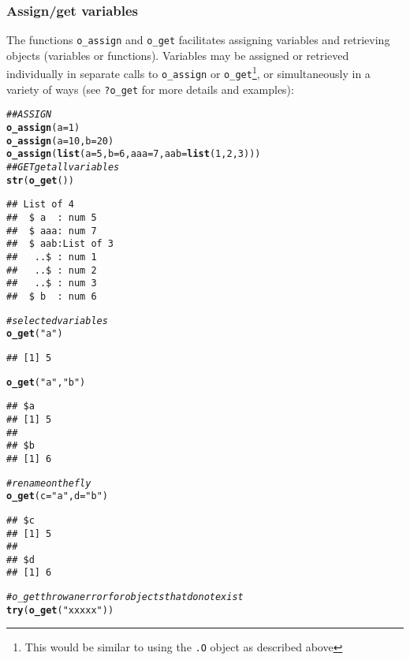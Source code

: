 \documentclass[english,10pt,a4paper]{article}\usepackage[]{graphicx}\usepackage[]{color}
\makeatletter
\newcommand{\hlnum}[1]{\textcolor[rgb]{0.686,0.059,0.569}{#1}}%
\newcommand{\hlstr}[1]{\textcolor[rgb]{0.192,0.494,0.8}{#1}}%
\newcommand{\hlcom}[1]{\textcolor[rgb]{0.678,0.584,0.686}{\textit{#1}}}%
\newcommand{\hlstd}[1]{\textcolor[rgb]{0.345,0.345,0.345}{#1}}%
\newcommand{\hlkwc}[1]{\textcolor[rgb]{0.333,0.667,0.333}{#1}}%
\newcommand{\hlkwd}[1]{\textcolor[rgb]{0.737,0.353,0.396}{\textbf{#1}}}%
\newenvironment{kframe}{%
 \def\at@end@of@kframe{}%
 \ifinner\ifhmode%
  \def\at@end@of@kframe{\end{minipage}}%
  \begin{minipage}{\columnwidth}%
 \fi\fi%
 \def\FrameCommand##1{\hskip\@totalleftmargin \hskip-\fboxsep
 \colorbox{shadecolor}{##1}\hskip-\fboxsep
     \hskip-\linewidth \hskip-\@totalleftmargin \hskip\columnwidth}%
 \MakeFramed {\advance\hsize-\width
   \@totalleftmargin\z@ \linewidth\hsize
   \@setminipage}}%
 {\par\unskip\endMakeFramed%
 \at@end@of@kframe}
\newenvironment{knitrout}{}{} %
\let\code=\texttt
\makeatother
\begin{document}
\subsubsection{Assign/get variables}

The functions \code{o\_assign} and \code{o\_get} facilitates assigning variables
and retrieving objects (variables or functions).
Variables may be assigned or retrieved individually in separate calls to
\code{o\_assign} or \code{o\_get}\footnote{This would be similar to using the
\code{.O} object as described above}, or simultaneously in a variety of ways
(see \code{?o\_get} for more details and examples):

\begin{knitrout}
\color{fgcolor}\begin{kframe}
\begin{alltt}
\hlcom{## ASSIGN}
\hlkwd{o_assign}\hlstd{(}\hlkwc{a} \hlstd{=} \hlnum{1}\hlstd{)}
\hlkwd{o_assign}\hlstd{(}\hlkwc{a} \hlstd{=} \hlnum{10}\hlstd{,} \hlkwc{b} \hlstd{=} \hlnum{20}\hlstd{)}
\hlkwd{o_assign}\hlstd{(}\hlkwd{list}\hlstd{(}\hlkwc{a} \hlstd{=} \hlnum{5}\hlstd{,} \hlkwc{b} \hlstd{=} \hlnum{6}\hlstd{,} \hlkwc{aaa} \hlstd{=} \hlnum{7}\hlstd{,} \hlkwc{aab} \hlstd{=} \hlkwd{list}\hlstd{(}\hlnum{1}\hlstd{,} \hlnum{2}\hlstd{,} \hlnum{3}\hlstd{)))}
\hlcom{## GET get all variables}
\hlkwd{str}\hlstd{(}\hlkwd{o_get}\hlstd{())}
\end{alltt}
\begin{verbatim}
## List of 4
##  $ a  : num 5
##  $ aaa: num 7
##  $ aab:List of 3
##   ..$ : num 1
##   ..$ : num 2
##   ..$ : num 3
##  $ b  : num 6
\end{verbatim}
\begin{alltt}
\hlcom{# selected variables}
\hlkwd{o_get}\hlstd{(}\hlstr{"a"}\hlstd{)}
\end{alltt}
\begin{verbatim}
## [1] 5
\end{verbatim}
\begin{alltt}
\hlkwd{o_get}\hlstd{(}\hlstr{"a"}\hlstd{,} \hlstr{"b"}\hlstd{)}
\end{alltt}
\begin{verbatim}
## $a
## [1] 5
## 
## $b
## [1] 6
\end{verbatim}
\begin{alltt}
\hlcom{# rename on the fly}
\hlkwd{o_get}\hlstd{(}\hlkwc{c} \hlstd{=} \hlstr{"a"}\hlstd{,} \hlkwc{d} \hlstd{=} \hlstr{"b"}\hlstd{)}
\end{alltt}
\begin{verbatim}
## $c
## [1] 5
## 
## $d
## [1] 6
\end{verbatim}
\begin{alltt}
\hlcom{# o_get throw an error for objects that do not exist}
\hlkwd{try}\hlstd{(}\hlkwd{o_get}\hlstd{(}\hlstr{"xxxxx"}\hlstd{))}
\end{alltt}



\end{kframe}
\end{knitrout}
\end{document}

